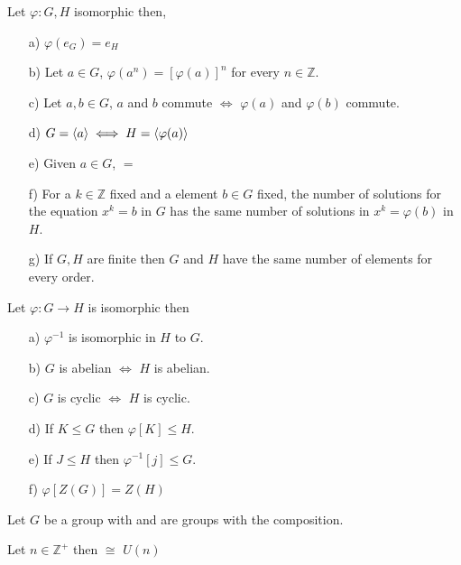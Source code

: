 \begin{assignment}[
  header=HeaderA,
  body=BodyA,
  title={Proved Theorems in  Group Theory},
  duedate={\today},
  toc=false,
  toctitle={This appears on the Table of contents.},
  exlist=false
]
\begin{mtheorem}
Let $\varphi: G, H$ isomorphic then,
\begin{enumerate}
    \item[a)] $\varphi(e_G) = e_H$
    \item[b)] Let $a \in G$, $\varphi(a^n) = [\varphi(a)]^n$ for every $n \in \mathbb{Z}$.
    \item[c)] Let $a,b \in G$, $a$ and $b$ commute $\iff$ $\varphi(a)$ and $\varphi(b)$ commute.
    \item[d)] $G = \langle a \rangle \iff H = \langle \varphi(a) \rangle$
    \item[e)] Given $a\in G$,  $=$ 
    \item[f)] For a $k \in \mathbb{Z}$ fixed and a element $b \in G$ fixed, the number of solutions for the equation $x^k = b$ in $G$ has the same number of solutions in $x^k = \varphi(b)$ in $H$.
    \item[g)] If $G,H$ are finite then $G$ and $H$ have the same number of elements for every order.
\end{enumerate}
\end{mtheorem}

\begin{mtheorem}[25][][thm:25]
Let $\varphi: G\to H$ is isomorphic then
\begin{enumerate}
    \item[a)] $\varphi^{-1}$ is isomorphic in $H$ to $G$.
    \item[b)] $G$ is abelian $\iff$ $H$ is abelian.
    \item[c)] $G$ is cyclic $\iff$ $H$ is cyclic.
    \item[d)] If $K \leq G$ then $\varphi[K] \leq H$. 
    \item[e)] If $J \leq H$ then $\varphi^{-1}[j] \leq G$.
    \item[f)] $\varphi[Z(G)] = Z(H)$
\end{enumerate}
\end{mtheorem}

\begin{mtheorem}[26][][thm:26]
Let $G$ be a group with  and  are groups with the composition.
\end{mtheorem}

\begin{mtheorem}[27][][thm:27]
Let $n \in \mathbb{Z}^+$ then  $\cong$ $U(n)$ 
\end{mtheorem}


\end{assignment}

